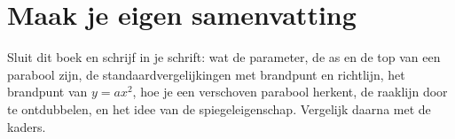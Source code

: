 

\begin{oefeningen}


\end{oefeningen}


\begin{oefeningen}




\end{oefeningen}


\ifzelfstudie
\section*{Maak je eigen samenvatting}
Sluit dit boek en schrijf in je schrift: wat de parameter, de as en de top van een parabool zijn, de standaardvergelijkingen met brandpunt en richtlijn, het brandpunt van $y = ax^2$, hoe je een verschoven parabool herkent, de raaklijn door te ontdubbelen, en het idee van de spiegeleigenschap. Vergelijk daarna met de kaders.
\fi

